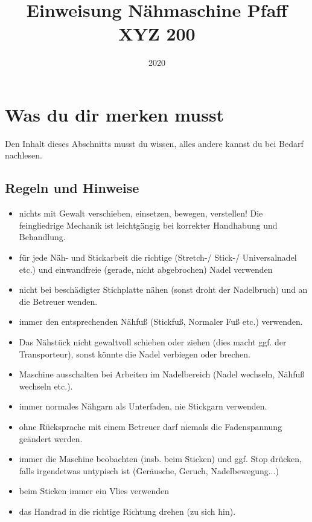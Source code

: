 \documentclass{\basedir/fablab-document}
\date{2020}
\author{}
\title{Einweisung Nähmaschine Pfaff XYZ 200 \todo{genaues Modell}}
\renewcommand{\todo}[1]{\textbf{\color{red}{TODO: #1}}}
\begin{document}
\maketitle



{\LARGE  \todo{ACHTUNG UNFERTIG - Es ist noch keine Einweisung möglich bis das Dokument fertig ist und dieser Hinweis entfernt wurde. Der jetzige Inhalt ist ohne nachzudenken von der Stickmaschine kopiert und vieles stimmt nicht.}}



\section{Was du dir merken musst}
Den Inhalt dieses Abschnitts musst du wissen, alles andere kannst du bei Bedarf nachlesen.
\subsection{Regeln und Hinweise}
\begin{itemize}
 \item nichts mit Gewalt verschieben, einsetzen, bewegen, verstellen! Die feingliedrige Mechanik ist leichtgängig bei korrekter Handhabung und Behandlung.
 \item für jede Näh- und Stickarbeit die richtige (Stretch-/ Stick-/ Universalnadel etc.) und einwandfreie (gerade, nicht abgebrochen) Nadel verwenden
 \item nicht bei beschädigter Stichplatte nähen (sonst droht der Nadelbruch) und an die Betreuer wenden.
 \item immer den entsprechenden Nähfuß (Stickfuß, Normaler Fuß etc.) verwenden.
 \item Das Nähstück nicht gewaltvoll schieben oder ziehen (dies macht ggf. der Transporteur), sonst könnte die Nadel verbiegen oder brechen.
 \item Maschine ausschalten bei Arbeiten im Nadelbereich (Nadel wechseln, Nähfuß wechseln etc.).
 \item immer normales Nähgarn als Unterfaden, nie Stickgarn verwenden.
 \item ohne Rücksprache mit einem Betreuer darf niemals die Fadenspannung geändert werden.
 \item immer die Maschine beobachten (insb. beim Sticken) und ggf. Stop drücken, falls irgendetwas untypisch ist (Geräusche, Geruch, Nadelbewegung...)
 \item beim Sticken immer ein Vlies verwenden
 \item das Handrad in die richtige Richtung drehen (zu sich hin).
\end{itemize}
\end{document}
